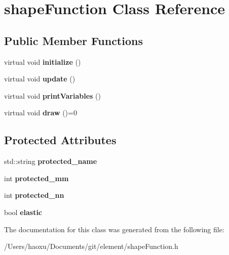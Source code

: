 \hypertarget{classshape_function}{}\section{shape\+Function Class Reference}
\label{classshape_function}
\subsection*{Public Member Functions}
\begin{DoxyCompactItemize}
\item 
\mbox{\label{classshape_function_ac1141a6995ff52a1ee9cdec1432c8c6b}} 
virtual void {\bfseries initialize} ()
\item 
\mbox{\label{classshape_function_ae891682dd600ec213cddf720de88e3b3}} 
virtual void {\bfseries update} ()
\item 
\mbox{\label{classshape_function_a0d91c61fa1b32fa8bf847d16a1eaeef0}} 
virtual void {\bfseries print\+Variables} ()
\item 
\mbox{\label{classshape_function_a2e73f13712f4c8209d22d7a3eac786ed}} 
virtual void {\bfseries draw} ()=0
\end{DoxyCompactItemize}
\subsection*{Protected Attributes}
\begin{DoxyCompactItemize}
\item 
\mbox{\label{classshape_function_a5e7ad542ec601ba5197c5f71e08a4d8a}} 
std\+::string {\bfseries protected\+\_\+name}
\item 
\mbox{\label{classshape_function_aef56a16d1c4f4d4dfd66b87fa6347809}} 
int {\bfseries protected\+\_\+mm}
\item 
\mbox{\label{classshape_function_a2de77edf7776bbef75a0f71d299cc5d7}} 
int {\bfseries protected\+\_\+nn}
\item 
\mbox{\label{classshape_function_a019e945e7c2ed8cabbf2bdece355d2aa}} 
bool {\bfseries elastic}
\end{DoxyCompactItemize}


The documentation for this class was generated from the following file\+:\begin{DoxyCompactItemize}
\item 
/\+Users/haoxu/\+Documents/git/element/shape\+Function.\+h\end{DoxyCompactItemize}
